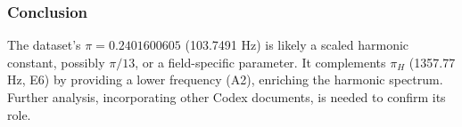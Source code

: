 \documentclass[a4paper,12pt]{article}
\begin{document}
\subsubsection{Conclusion}
The dataset’s \(\pi = 0.2401600605\) (103.7491 Hz) is likely a scaled harmonic constant, possibly \(\pi / 13\), or a field-specific parameter. It complements \(\pi_H\) (1357.77 Hz, E6) by providing a lower frequency (A2), enriching the harmonic spectrum. Further analysis, incorporating other Codex documents, is needed to confirm its role.
\end{document}
